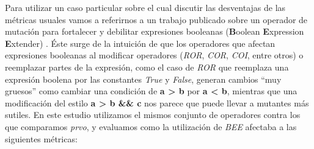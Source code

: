 Para utilizar un caso particular sobre el cual discutir las desventajas de las m\'etricas usuales vamos a referirnos a un trabajo publicado sobre un operador de mutaci\'on para fortalecer y debilitar expresiones booleanas (\textbf{B}oolean \textbf{E}xpression \textbf{E}xtender) \cite{bibliography.mutation.operators.beeBridaS17}. \'Este surge de la intuici\'on de que los operadores que afectan expresiones booleanas al modificar operadores (\emph{ROR}, \emph{COR}, \emph{COI}, entre otros) o reemplazar partes de la expresi\'on, como el caso de \emph{ROR} que reemplaza una expresi\'on boolena por las constantes \emph{True} y \emph{False}, generan cambios ``muy gruesos'' como cambiar una condici\'on de \textbf{a > b} por \textbf{a < b}, mientras que una modificaci\'on del estilo \textbf{a > b \&\& c} nos parece que puede llevar a mutantes m\'as sutiles. En este estudio utilizamos el mismos conjunto de operadores contra los que comparamos \emph{prvo}, y evaluamos como la utilizaci\'on de \emph{BEE} afectaba a las siguientes m\'etricas:
